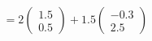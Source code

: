 \documentclass[preview]{standalone}
\begin{document}
\begin{align*}
= 2 \begin{pmatrix} 1.5 \\ 0.5 \end{pmatrix} + 1.5 \begin{pmatrix} -0.3 \\ 2.5 \end{pmatrix}
\end{align*}
\end{document}

